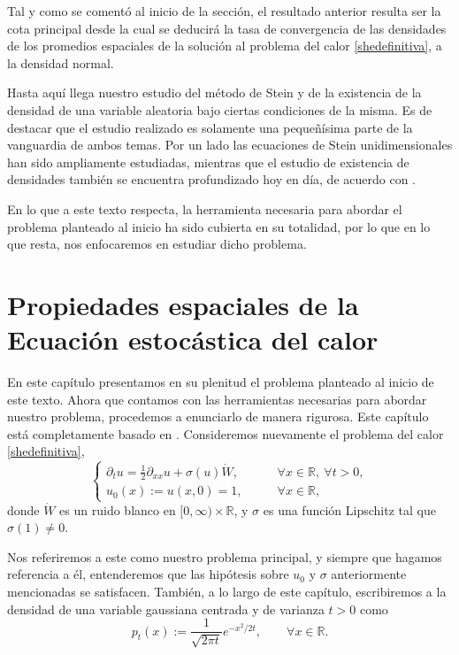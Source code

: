 \documentclass[letterpaper,twoside,12pt]{book}
\newcommand{\R}{\mathbb{R}}
\newcommand{\1}{\mathds{1}}
\theoremstyle{definition}
\theoremstyle{definition}
\theoremstyle{remark}
\theoremstyle{definition}
\theoremstyle{definition}
\theoremstyle{definition}
\theoremstyle{definition}
\theoremstyle{definition}
\begin{document}
Tal y como se comentó al inicio de la sección, el resultado anterior resulta ser la cota principal desde la cual se deducirá la tasa de convergencia de las densidades de los promedios espaciales de la solución al problema del calor \eqref{shedefinitiva}, a la densidad normal. 

Hasta aquí llega nuestro estudio del método de Stein y de la existencia de la densidad de una variable aleatoria bajo ciertas condiciones de la misma. Es de destacar que el estudio realizado es solamente una pequeñísima parte de la vanguardia de ambos temas. Por un lado las ecuaciones de Stein unidimensionales han sido ampliamente estudiadas, mientras que el estudio de existencia de densidades también se encuentra profundizado hoy en día, de acuerdo con \cite{Nourdin_Peccati_2012}. 

En lo que a este texto respecta, la herramienta necesaria para abordar el problema planteado al inicio ha sido cubierta en su totalidad, por lo que en lo que resta, nos enfocaremos en estudiar dicho problema.


\chapter{Propiedades espaciales de la Ecuación estocástica del calor}
En este capítulo presentamos en su plenitud el problema planteado al inicio de este texto. Ahora que contamos con las herramientas necesarias para abordar nuestro problema, procedemos a enunciarlo de manera rigurosa. Este capítulo está completamente basado en \cite[pp. 68-71, 75-86]{KUZGUN202268}. Consideremos nuevamente el problema del calor \eqref{shedefinitiva},
\begin{equation*}
   \begin{cases}
      \partial_t u=\frac{1}{2}\partial_{xx}u+\sigma(u)\dot{W}, & \qquad \forall x\in \R, \ \forall t>0,\\
      u_0(x):=u(x,0)=1, & \qquad \forall x\in \R,
   \end{cases}
\end{equation*}
donde $\dot{W}$ es un ruido blanco en $[0,\infty)\times\R$, y $\sigma$ es una función Lipschitz tal que $\sigma(1)\neq 0$.

Nos referiremos a este como nuestro problema principal, y siempre que hagamos referencia a él, entenderemos que las hipótesis sobre $u_0$ y $\sigma$ anteriormente mencionadas se satisfacen. También, a lo largo de este capítulo, escribiremos a la densidad de una variable gaussiana centrada y de varianza $t>0$ como
\[
p_t(x):=\frac{1}{\sqrt{2\pi t}}e^{-x^2/2t}, \qquad \forall x\in \R.
\]
\end{document}
